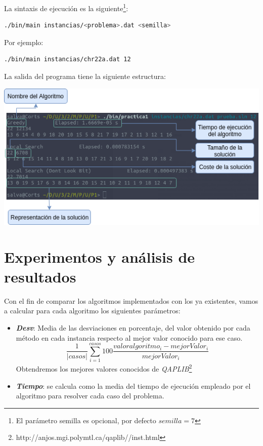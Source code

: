 \documentclass[a4paper, 12pt]{article}
\begin{document}
      \newpage
      La sintaxis de ejecución es la siguiente\footnote{El parámetro semilla es opcional, por defecto $semilla = 7$}:
      \begin{lstlisting}[language=bash]
./bin/main instancias/<problema>.dat <semilla>
      \end{lstlisting}
      
      Por ejemplo:
      \begin{lstlisting}[language=bash]
./bin/main instancias/chr22a.dat 12
      \end{lstlisting}
      
      La salida del programa tiene la siguiente estructura:
      \begin{center}
      \includegraphics[scale=0.7]{execOutDiagram}
      \end{center}
      
      
      \newpage
      \section{Experimentos y análisis de resultados}
      Con el fin de comparar los algoritmos implementados con los ya existentes, vamos a calcular para cada algoritmo los siguientes parámetros:
      \begin{itemize}
         \item \textbf{\textit{Desv}}: Media de las desviaciones en porcentaje, del valor obtenido por cada método en cada instancia respecto al mejor valor conocido para ese caso.
         $$ \frac{1}{\left | casos \right |}\sum_{i=1}^{casos}100\frac{valoralgoritmo_i - mejorValor_i}{mejorValor_i} $$
         Obtendremos los mejores valores conocidos de \textit{QAPLIB}\footnote{http://anjos.mgi.polymtl.ca/qaplib//inst.html}
         
         \item \textbf{\textit{Tiempo}}: se calcula como la media del tiempo de ejecución empleado por el
algoritmo para resolver cada caso del problema.
      \end{itemize}
      
\end{document}
